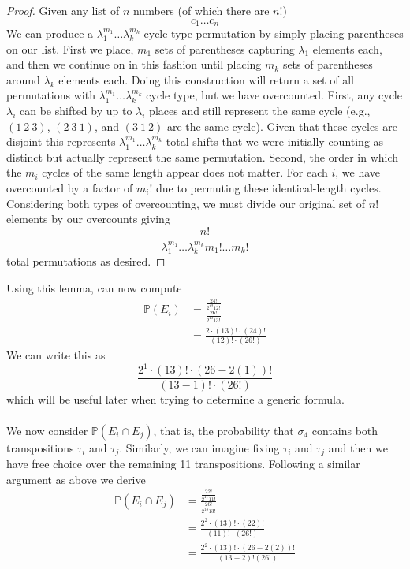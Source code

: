 \begin{proof}
	Given any list of $n$ numbers (of which there are $n!$)
	\[
		c_1\dots c_n
	\]
	We can produce a $\lambda_1^{m_1}\dots\lambda_k^{m_k}$ cycle type
	permutation by simply placing parentheses on our list. First we
	place, $m_1$ sets of parentheses capturing $\lambda_1$ elements
	each, and then we continue on in this fashion until placing $m_k$
	sets of parentheses around $\lambda_k$ elements each. Doing this
	construction will return a set of all permutations with
	$\lambda_1^{m_1}\dots\lambda_k^{m_k}$ cycle type, but we have
	overcounted. First, any cycle $\lambda_i$ can be shifted by up to
	$\lambda_i$ places and still represent the same cycle (e.g.,
	$(1\ 2\ 3)$, $(2\ 3\ 1)$, and $(3\ 1\ 2)$ are the same cycle).
	Given that these cycles are disjoint this represents
	$\lambda_1^{m_1}\dots\lambda_k^{m_k}$ total shifts that we were
	initially counting as distinct but actually represent the same
	permutation. Second, the order in which the $m_i$ cycles of the
	same length appear does not matter. For each $i$, we have
	overcounted by a factor of $m_i!$ due to permuting these
	identical-length cycles. Considering both types of overcounting, we
	must divide our original set of $n!$ elements by our overcounts giving
	\[
		\frac{n!}{\lambda_1^{m_1}\dots\lambda_k^{m_k}m_1!\dots m_k!}
	\]
	total permutations as desired.
\end{proof}
\noindent Using this lemma, can now compute
\begin{align*}
	\mathbb{P}(E_i) & = \frac{\frac{24!}{2^{12}12!}}{\frac{26!}{2^{13}13!}} \\
	                & =  \frac{2\cdot(13)!\cdot(24)!}{(12)!\cdot(26!)}
\end{align*}
We can write this as
\[
	\frac{2^1\cdot(13)!\cdot(26-2(1))!}{(13-1)!\cdot(26!)}
\]
which will be useful later when trying to determine a generic formula.
\\\\We now consider $\mathbb{P}(E_i\cap E_j)$, that is, the
probability that $\sigma_4$ contains both transpositions $\tau_i$ and
$\tau_j$. Similarly, we can imagine fixing $\tau_i$ and $\tau_j$ and
then we have free choice over the remaining 11 transpositions.
Following a similar argument as above we derive
\begin{align*}
	\mathbb{P}(E_i\cap E_j) & =
	\frac{\frac{22!}{2^{11}11!}}{\frac{26!}{2^{13}13!}}
	\\
	                        & =  \frac{2^2\cdot(13)!\cdot(22)!}{(11)!\cdot(26!)}  \\
	                        & = \frac{2^2\cdot(13)!\cdot(26-2(2))!}{(13-2)!(26!)}
\end{align*}
